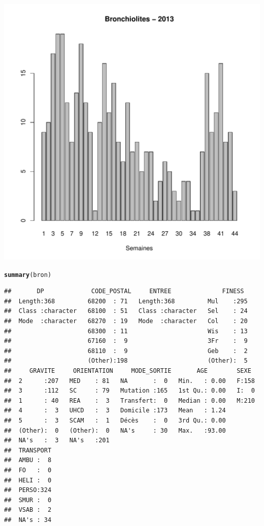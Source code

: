\documentclass[12pt,english,french,twoside]{report}\usepackage[]{graphicx}\usepackage[]{color}
\makeatletter
\def\maxwidth{ %
  \ifdim\Gin@nat@width>\linewidth
    \linewidth
  \else
    \Gin@nat@width
  \fi
}
\newcommand{\hlstd}[1]{\textcolor[rgb]{0.345,0.345,0.345}{#1}}%
\newcommand{\hlkwd}[1]{\textcolor[rgb]{0.737,0.353,0.396}{\textbf{#1}}}%
\newenvironment{kframe}{%
 \def\at@end@of@kframe{}%
 \ifinner\ifhmode%
  \def\at@end@of@kframe{\end{minipage}}%
  \begin{minipage}{\columnwidth}%
 \fi\fi%
 \def\FrameCommand##1{\hskip\@totalleftmargin \hskip-\fboxsep
 \colorbox{shadecolor}{##1}\hskip-\fboxsep
     \hskip-\linewidth \hskip-\@totalleftmargin \hskip\columnwidth}%
 \MakeFramed {\advance\hsize-\width
   \@totalleftmargin\z@ \linewidth\hsize
   \@setminipage}}%
 {\par\unskip\endMakeFramed%
 \at@end@of@kframe}
\newenvironment{knitrout}{}{} %
\makeatother
\begin{document}
\begin{knitrout}
\includegraphics[width=\maxwidth]{figure/bron2} 
\begin{kframe}\begin{alltt}
\hlkwd{summary}\hlstd{(bron)}
\end{alltt}
\begin{verbatim}
##       DP             CODE_POSTAL     ENTREE              FINESS   
##  Length:368         68200  : 71   Length:368         Mul    :295  
##  Class :character   68100  : 51   Class :character   Sel    : 24  
##  Mode  :character   68270  : 19   Mode  :character   Col    : 20  
##                     68300  : 11                      Wis    : 13  
##                     67160  :  9                      3Fr    :  9  
##                     68110  :  9                      Geb    :  2  
##                     (Other):198                      (Other):  5  
##     GRAVITE     ORIENTATION     MODE_SORTIE       AGE        SEXE   
##  2      :207   MED    : 81   NA       :  0   Min.   : 0.00   F:158  
##  3      :112   SC     : 79   Mutation :165   1st Qu.: 0.00   I:  0  
##  1      : 40   REA    :  3   Transfert:  0   Median : 0.00   M:210  
##  4      :  3   UHCD   :  3   Domicile :173   Mean   : 1.24          
##  5      :  3   SCAM   :  1   Décès    :  0   3rd Qu.: 0.00          
##  (Other):  0   (Other):  0   NA's     : 30   Max.   :93.00          
##  NA's   :  3   NA's   :201                                          
##  TRANSPORT  
##  AMBU :  8  
##  FO   :  0  
##  HELI :  0  
##  PERSO:324  
##  SMUR :  0  
##  VSAB :  2  
##  NA's : 34
\end{verbatim}
\end{kframe}
\end{knitrout}
\end{document}
